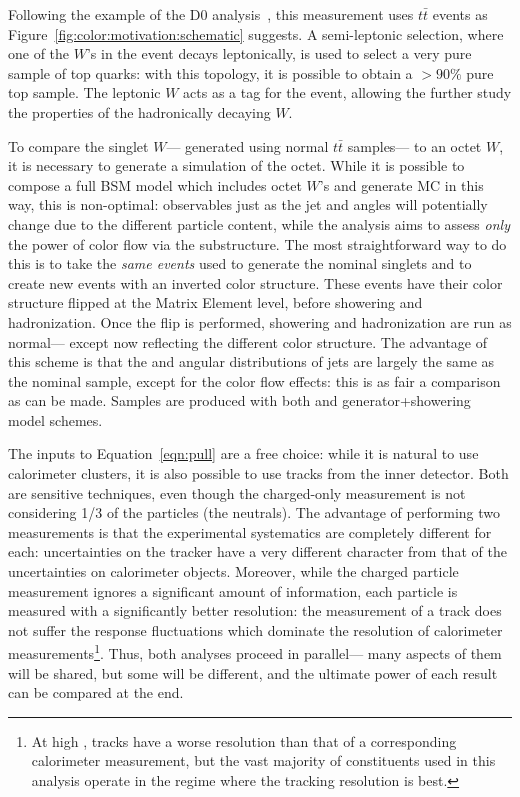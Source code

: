 Following the example of the D0 analysis~\cite{Abazov:2011vh}, this measurement uses $t\bar{t}$ events as Figure~\ref{fig:color:motivation:schematic} suggests. A semi-leptonic selection, where one of the $W$'s in the event decays leptonically, is used to select a very pure sample of top quarks: with this topology, it is possible to obtain a $>90\%$ pure top sample. The leptonic $W$ acts as a tag for the event, allowing the further study the properties of the hadronically decaying $W$.

To compare the singlet $W$--- generated using normal \PowPythia $t\bar{t}$ samples--- to an octet $W$, it is necessary to generate a simulation of the octet. While it is possible to compose a full BSM model which includes octet $W$'s and generate MC in this way, this is non-optimal: observables just as the jet \pt and angles will potentially change due to the different particle content, while the analysis aims to assess \textit{only} the power of color flow via the substructure. The most straightforward way to do this is to take the \textit{same events} used to generate the nominal singlets and to create new events with an inverted color structure. These events have their color structure flipped at the Matrix Element level, before showering and hadronization. Once the flip is performed, showering and hadronization are run as normal--- except now reflecting the different color structure. The advantage of this scheme is that the \pt and angular distributions of jets are largely the same as the nominal sample, except for the color flow effects: this is as fair a comparison as can be made. Samples are produced with both \PowPythia and \PowHerwig generator+showering model schemes. 


The inputs to Equation~\ref{eqn:pull} are a free choice: while it is natural to use calorimeter clusters, it is also possible to use tracks from the inner detector. Both are sensitive techniques, even though the charged-only measurement is not considering 1/3 of the particles (the neutrals). The advantage of performing two measurements is that the experimental systematics are completely different for each: uncertainties on the tracker have a very different character from that of the uncertainties on calorimeter objects. Moreover, while the charged particle measurement ignores a significant amount of information, each particle is measured with a significantly better resolution: the \pt measurement of a track does not suffer the response fluctuations which dominate the resolution of calorimeter measurements\footnote{At high \pt, tracks have a worse resolution than that of a corresponding calorimeter measurement, but the vast majority of constituents used in this analysis operate in the regime where the tracking resolution is best.}. Thus, both analyses proceed in parallel--- many aspects of them will be shared, but some will be different, and the ultimate power of each result can be compared at the end.


